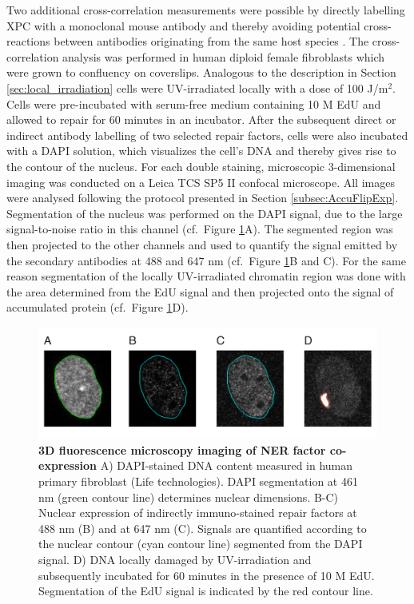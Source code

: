 Two additional cross-correlation measurements were possible by directly labelling XPC with a monoclonal mouse antibody and thereby avoiding potential cross-reactions between antibodies originating from the same host species \cite{Burry2011,Giepmans2006}. The cross-correlation analysis was performed in human diploid female fibroblasts which were grown to confluency on coverslips. Analogous to the description in Section \ref{sec:local_irradiation} cells were UV-irradiated locally with a dose of 100 J/$\text{m}^\text{2}$. Cells were pre-incubated with serum-free medium containing 10 \textmu M EdU and allowed to repair for 60 minutes in an incubator. After the subsequent direct or indirect antibody labelling of two selected repair factors, cells were also incubated with a DAPI solution, which visualizes the cell's DNA and thereby gives rise to the contour of the nucleus. For each double staining, microscopic 3-dimensional imaging was conducted on a Leica TCS SP5 II confocal microscope. All images were analysed following the protocol presented in Section \ref{subsec:AccuFlipExp}. Segmentation of the nucleus was performed on the DAPI signal, due to the large signal-to-noise ratio in this channel (cf.\ Figure \ref{fig:coStaining}A). The segmented region was then projected to the other channels and used to quantify the signal emitted by the secondary antibodies at 488 and 647 nm (cf.\ Figure \ref{fig:coStaining}B and C). For the same reason segmentation of the locally UV-irradiated chromatin region was done with the area determined from the EdU signal and then projected onto the signal of accumulated protein (cf.\ Figure \ref{fig:coStaining}D).   

\begin{figure}[t!]
	\begin{center}
		\includegraphics[width=1\textwidth]{Abbildungen/figure4_1.pdf}
		\caption{\textbf{3D fluorescence microscopy imaging of NER factor co-expression} A) DAPI-stained DNA content measured in human primary fibroblast (Life technologies). DAPI segmentation at 461 nm  (green contour line) determines nuclear dimensions. B-C) Nuclear expression of indirectly immuno-stained repair factors at 488 nm (B) and at 647 nm (C). Signals are quantified according to the nuclear contour (cyan contour line) segmented from the DAPI signal. D) DNA locally damaged by UV-irradiation and subsequently incubated for 60 minutes in the presence of 10 \textmu M EdU. Segmentation of the EdU signal is indicated by the red contour line.   }
		\label{fig:coStaining}
	\end{center}
\end{figure}

